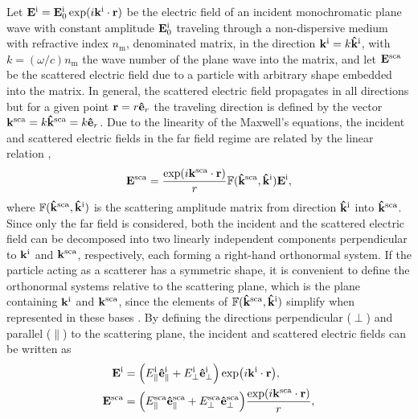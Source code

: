 
Let $\vb{E}^\text{i} = \vb{E}^\text{i}_0 \exp(i\vb{k}^\text{i}\cdot\vb{r})$ be the electric field of an incident monochromatic plane wave with constant amplitude $\vb{E}_0^\text{i}$  traveling through a non-dispersive medium with refractive index $n_\text{m}$, denominated matrix, in the direction $\vb{k}^\text{i} = k\vu{k}^\text{i}$, with $k = (\omega/c)n_\text{m}$ the wave number of the plane wave into the matrix, and let $\vb{E}^\text{sca}$ be the scattered electric field due to a particle with arbitrary shape embedded into the matrix. In general, the scattered electric field propagates in all directions but for a given point $\vb{r} = r\vu{e}_r$ the traveling direction is defined by the vector $\vb{k}^\text{sca} = k\vu{k}^\text{sca} = k\vu{e}_r$.  Due to the linearity of the Maxwell's equations,   the incident and scattered electric fields  in the far field regime are related by the linear relation \cite{tsang_scattering_2000}, 
%
 \begin{equation}
	\vb{E}^\text{sca} =   \frac{\exp(i\vb{k}^\text{sca}\cdot\vb{r})}{r} \mathbb{F}(\vu{k}^\text{sca}, \vu{k}^\text{i}) \vb{E}^\text{i},
 \label{eq:ScatAmpMat}
 \end{equation}
%
where $\mathbb{F}(\vu{k}^\text{sca}, \vu{k}^\text{i})$ is the scattering  amplitude matrix from direction $\vu{k}^\text{i}$ into $\vu{k}^\text{sca}$. Since only the far field is considered, both the incident and the scattered electric field can be decomposed into two linearly independent components perpendicular to $\vb{k}^\text{i}$ and $\vb{k}^\text{sca}$, respectively, each forming a right-hand orthonormal system. If the particle acting as a scatterer has a symmetric shape, it is convenient to define the orthonormal systems relative to the scattering plane, which is the plane containing $\vb{k}^\text{i}$ and $\vb{k}^\text{sca}$, since the elements of $\mathbb{F}(\vu{k}^\text{sca}, \vu{k}^\text{i})$ simplify when represented in these bases \cite{tsang_scattering_2000}. By defining the directions perpendicular  ($\perp$) and parallel ($\parallel$) to the scattering plane, the incident and scattered electric fields can be written as
%
 \begin{align}
	\vb{E}^\text{i} & =  \qty(E_\parallel^\text{i}\vu{e}^\text{i}_\parallel + E_\perp^\text{i} \vu{e}_\perp^\text{i}) \exp(i\vb{k}^\text{i}\cdot\vb{r}),
 \label{eq:Ei} \\
	\vb{E}^\text{sca} & = \qty(E_\parallel^\text{sca}\vu{e}^\text{sca}_\parallel + E_\perp^\text{sca} \vu{e}_\perp^\text{sca}) \frac{\exp(i\vb{k}^\text{sca}\cdot\vb{r})}{r},
 \label{eq:Es}
 \end{align}
